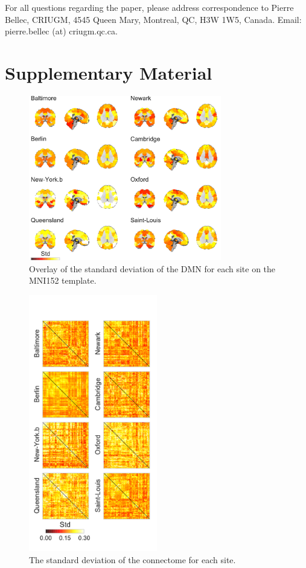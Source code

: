 \documentclass[authoryear]{elsarticle}
\begin{document}
For all questions regarding the paper, please address correspondence to Pierre Bellec, CRIUGM, 4545 Queen Mary, Montreal, QC, H3W 1W5, Canada. Email: pierre.bellec (at) criugm.qc.ca.\\

\section*{Supplementary Material} 

\begin{figure}[tbp]
\centering
\includegraphics[width=0.75\textwidth]{../figures/dmn_stdmultisite.pdf}
\caption[]{
Overlay of the standard deviation of the DMN for each site on the MNI152 template.
}
\label{fig_std_DMNs}
\end{figure}

\begin{figure}[tbp]
\centering
\includegraphics[width=0.50\textwidth]{../figures/connectome_std_multisite2.pdf}
\caption[]{
The standard deviation of the connectome for each site.
}
\label{fig_std_connectomes}
\end{figure}
\end{document}

